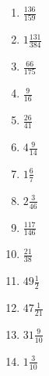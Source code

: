 \documentclass[12pt]{article}
\begin{document}
\begin{enumerate}
\item $ \frac{136}{159} $
\item $ 1 \frac{131}{384} $
\item $ \frac{66}{175} $
\item $ \frac{9}{16} $
\item $ \frac{26}{41} $
\item $ 4 \frac{9}{14} $
\item $ 1 \frac{6}{7} $
\item $ 2 \frac{3}{46} $
\item $ \frac{117}{146} $
\item $ \frac{21}{38} $
\item $ 49 \frac{1}{2} $
\item $ 47 \frac{1}{21} $
\item $ 31 \frac{9}{10} $
\item $ 1 \frac{3}{10} $
\end{enumerate}
\newpage
\end{document}
